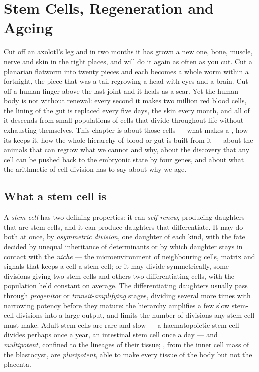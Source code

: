 \chapter{Stem Cells, Regeneration and Ageing}\label{ch:b3:stem-cells}

Cut off an axolotl's leg and in two months it has grown a new one,
bone, muscle, nerve and skin in the right places, and will do it
again as often as you cut. Cut a planarian flatworm into twenty pieces
and each becomes a whole worm within a fortnight, the piece that was a
tail regrowing a head with eyes and a brain. Cut off a human finger
above the last joint and it heals as a scar. Yet the human body is
not without renewal: every second it makes two million red blood
cells, the lining of the gut is replaced every five days, the skin
every month, and all of it descends from small populations of cells
that divide throughout life without exhausting themselves. This
chapter is about those cells --- what makes a , how its 
keeps it, how the whole hierarchy of blood or gut is built from it ---
about the animals that can regrow what we cannot and why, about the
discovery that any cell can be pushed back to the embryonic state by
four genes, and about what the arithmetic of cell division has to say
about why we age.

\section{What a stem cell is}

\begin{definition}\label{def:b3:stem-cells:stem}
A \emph{stem cell} has two defining properties: it can \emph{self-renew},
producing daughters that are stem cells, and it can produce daughters
that differentiate. It may do both at once, by \emph{asymmetric
division}, one daughter of each kind, with the fate decided by unequal
inheritance of determinants or by which daughter stays in contact with
the \emph{niche} --- the microenvironment of neighbouring cells,
matrix and signals that keeps a cell a stem cell; or it may divide
symmetrically, some divisions giving two stem cells and others two
differentiating cells, with the population held constant on average.
The differentiating daughters usually pass through \emph{progenitor}
or \emph{transit-amplifying} stages, dividing several more times with
narrowing potency before they mature: the hierarchy amplifies a few
slow stem-cell divisions into a large output, and limits the number of
divisions any stem cell must make. Adult stem cells are rare and slow
--- a haematopoietic stem cell divides perhaps once a year, an
intestinal stem cell once a day --- and \emph{multipotent}, confined to
the lineages of their tissue; , from the inner cell
mass of the blastocyst, are \emph{pluripotent}, able to make every
tissue of the body but not the placenta.
\end{definition}


